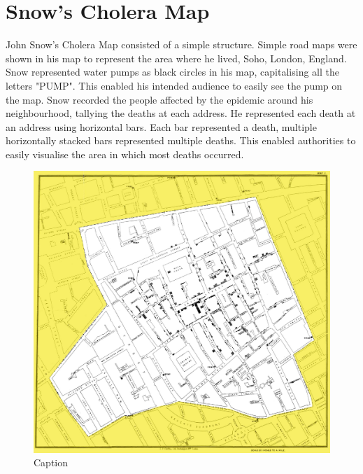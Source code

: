 \documentclass[12pt]{article}
\begin{document}
\section{Snow's Cholera Map}

John Snow's Cholera Map consisted of a simple structure. Simple road maps were shown in his map to represent the area where he lived, Soho, London, England. Snow represented water pumps as black circles in his map, capitalising all the letters "PUMP". This enabled his intended audience to easily see the pump on the map. Snow recorded the people affected by the epidemic around his neighbourhood, tallying the deaths at each address. He represented each death at an address using horizontal bars. Each bar represented a death, multiple horizontally stacked bars represented multiple deaths. This enabled authorities to easily visualise the area in which most deaths occurred.  


\begin{figure}
\centering
\includegraphics{snowmap_1854}
\caption{Caption}
\label{fig:snow}
\end{figure}
\end{document}
